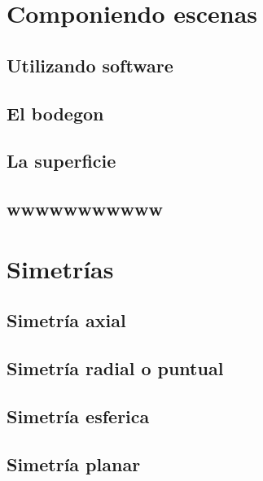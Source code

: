 \documentclass[16pt,]{krantz}
\theoremstyle{definition}
\theoremstyle{definition}
\theoremstyle{definition}
\theoremstyle{definition}
\theoremstyle{remark}
\begin{document}
\hypertarget{componiendo-escenas}{%
\section{Componiendo escenas}\label{componiendo-escenas}}

\hypertarget{utilizando-software}{%
\subsection{Utilizando software}\label{utilizando-software}}

\hypertarget{el-bodegon}{%
\subsection{El bodegon}\label{el-bodegon}}

\hypertarget{la-superficie}{%
\subsection{La superficie}\label{la-superficie}}

\hypertarget{wwwwwwwwwww}{%
\subsection{wwwwwwwwwww}\label{wwwwwwwwwww}}

\hypertarget{simetruxedas}{%
\section{Simetrías}\label{simetruxedas}}

\hypertarget{simetruxeda-axial}{%
\subsection{Simetría axial}\label{simetruxeda-axial}}

\hypertarget{simetruxeda-radial-o-puntual}{%
\subsection{Simetría radial o puntual}\label{simetruxeda-radial-o-puntual}}

\hypertarget{simetruxeda-esferica}{%
\subsection{Simetría esferica}\label{simetruxeda-esferica}}

\hypertarget{simetruxeda-planar}{%
\subsection{Simetría planar}\label{simetruxeda-planar}}
\end{document}
